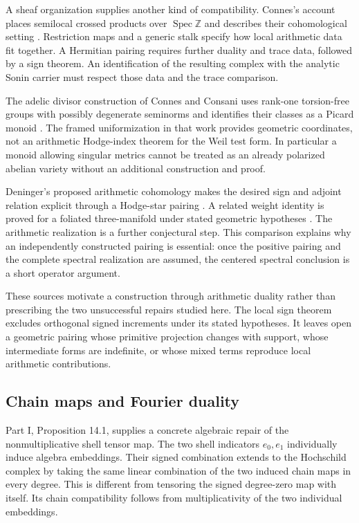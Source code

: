 \documentclass[11pt,letterpaper]{article}
\theoremstyle{definition}
\theoremstyle{remark}
\newcommand{\Z}{\mathbb Z}
\begin{document}
A sheaf organization supplies another kind of compatibility.
Connes's account places semilocal crossed products over
$\operatorname{Spec}\Z$ and describes their cohomological
setting \cite[Section 7.3, Theorem 7.2]{C26}.
Restriction maps and a generic stalk specify how local
arithmetic data fit together. A Hermitian pairing requires
further duality and trace data, followed by a sign theorem.
An identification of the resulting complex with the analytic
Sonin carrier must respect those data and the trace comparison.

The adelic divisor construction of Connes and Consani uses
rank-one torsion-free groups with possibly degenerate
seminorms and identifies their classes as a Picard monoid
\cite[Definition 3.1 and Theorem 3.4]{CC26}.
The framed uniformization in that work provides geometric
coordinates, not an arithmetic Hodge-index theorem for the
Weil test form. In particular a monoid allowing singular
metrics cannot be treated as an already polarized abelian
variety without an additional construction and proof.

Deninger's proposed arithmetic cohomology makes the desired
sign and adjoint relation explicit through a Hodge-star
pairing \cite[Section 3]{D05}. A related weight identity is
proved for a foliated three-manifold under stated geometric
hypotheses \cite[Theorem 4.1]{D05}. The arithmetic realization
is a further conjectural step. This comparison explains why
an independently constructed pairing is essential: once the
positive pairing and the complete spectral realization are
assumed, the centered spectral conclusion is a short
operator argument.

These sources motivate a construction through arithmetic
duality rather than prescribing the two unsuccessful
repairs studied here. The local sign theorem excludes
orthogonal signed increments under its stated hypotheses.
It leaves open a geometric pairing whose primitive
projection changes with support, whose intermediate forms
are indefinite, or whose mixed terms reproduce local
arithmetic contributions.

\subsection{Chain maps and Fourier duality}

Part I, Proposition 14.1, supplies a concrete algebraic
repair of the nonmultiplicative shell tensor map. The two
shell indicators $e_0,e_1$ individually induce algebra
embeddings. Their signed combination extends to the
Hochschild complex by taking the same linear combination
of the two induced chain maps in every degree. This is
different from tensoring the signed degree-zero map with
itself. Its chain compatibility follows from
multiplicativity of the two individual embeddings.
\end{document}
